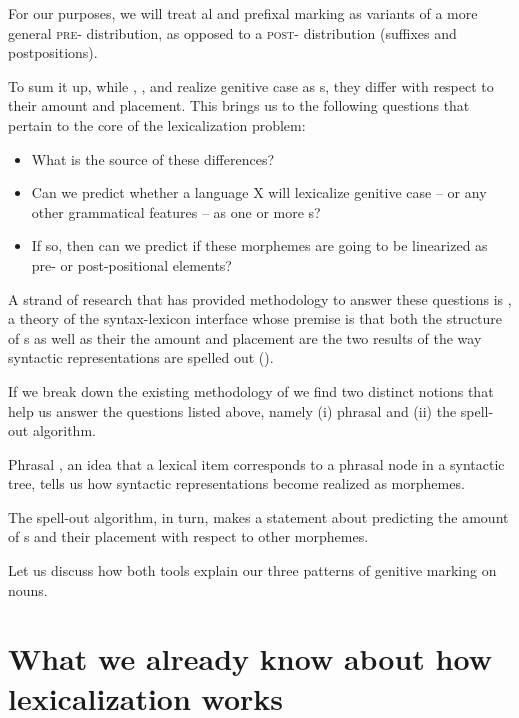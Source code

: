 For our purposes, we will treat al and prefixal marking as variants of a more general \textsc{pre-} distribution, as opposed to a \textsc{post-} distribution (suffixes and postpositions).
\par To sum it up, while , , and  realize genitive case as s, they differ with respect to their amount and placement. This brings us to the following questions that pertain to the core of the lexicalization problem: 

\begin{itemize}
\item What is the source of these differences?
\item  Can we predict whether a language X will lexicalize genitive case -- or any other grammatical features -- as one or more s? 
\item If so, then can we predict if these morphemes are going to be linearized as pre- or post-positional  elements? 
\end{itemize}
 
\par A strand of research that has provided methodology to answer these questions is , a theory of the syntax-lexicon interface whose premise is that both the  structure of s as well as their the amount and placement are the two results of the way syntactic representations are spelled out (\citealt{Starke2009,Starke2014}). 
\par
If we break down the existing methodology of  we find two distinct notions that help us answer the questions listed above, namely (i) phrasal  and (ii) the spell-out algorithm. 
\par
Phrasal , an idea that a lexical item corresponds to a phrasal node in a syntactic tree, tells us how syntactic representations become realized as morphemes. 
\par The spell-out algorithm, in turn, makes a statement about predicting the amount of s and their placement with respect to other morphemes.
\par
Let us discuss how both tools explain our three patterns of genitive marking on nouns. 

\section{What we already know about how lexicalization works}

